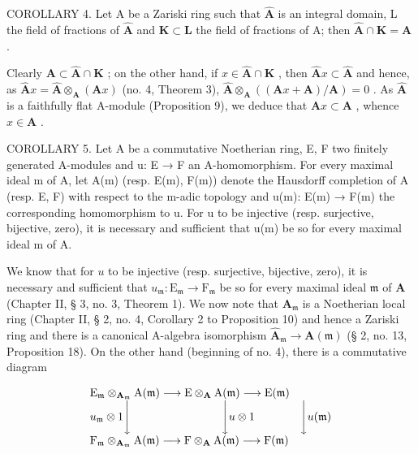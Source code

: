 COROLLARY 4. Let A be a Zariski ring such that \(\hat{\mathbf{A}}\) is an integral domain, L the field of fractions of \(\hat{\mathbf{A}}\) and \(\mathbf{K} \subset \mathbf{L}\) the field of fractions of A; then \(\hat{\mathbf{A}} \cap \mathbf{K} = \mathbf{A}\) .

Clearly \(\mathbf{A} \subset \hat{\mathbf{A}} \cap \mathbf{K}\) ; on the other hand, if \(x \in \hat{\mathbf{A}} \cap \mathbf{K}\) , then \(\hat{\mathbf{A}}x \subset \hat{\mathbf{A}}\) and hence, as \(\hat{\mathbf{A}}x = \hat{\mathbf{A}} \otimes_{\mathbf{A}} (\mathbf{A}x)\) (no. 4, Theorem 3), \(\hat{\mathbf{A}} \otimes_{\mathbf{A}} ((\mathbf{A}x + \mathbf{A}) / \mathbf{A}) = 0\) . As \(\hat{\mathbf{A}}\) is a faithfully flat A-module (Proposition 9), we deduce that \(\mathbf{A}x \subset \mathbf{A}\) , whence \(x \in \mathbf{A}\) .

COROLLARY 5. Let A be a commutative Noetherian ring, E, F two finitely generated A-modules and u: E → F an A-homomorphism. For every maximal ideal m of A, let A(m) (resp. E(m), F(m)) denote the Hausdorff completion of A (resp. E, F) with respect to the m-adic topology and u(m): E(m) → F(m) the corresponding homomorphism to u. For u to be injective (resp. surjective, bijective, zero), it is necessary and sufficient that u(m) be so for every maximal ideal m of A.

We know that for \(u\) to be injective (resp. surjective, bijective, zero), it is necessary and sufficient that \(u_{\mathfrak{m}}: \mathrm{E}_{\mathfrak{m}} \to \mathrm{F}_{\mathfrak{m}}\) be so for every maximal ideal \(\mathfrak{m}\) of \(\mathbf{A}\) (Chapter II, § 3, no. 3, Theorem 1). We now note that \(\mathbf{A}_{\mathfrak{m}}\) is a Noetherian local ring (Chapter II, § 2, no. 4, Corollary 2 to Proposition 10) and hence a Zariski ring and there is a canonical A-algebra isomorphism \(\hat{\mathbf{A}}_{\mathfrak{m}} \to \mathbf{A}(\mathfrak{m})\) (§ 2, no. 13, Proposition 18). On the other hand (beginning of no. 4), there is a commutative diagram

\[
\begin{array}{l} \mathrm{E} _ {\mathfrak {m}} \otimes_ {\mathbf {A} _ {\mathfrak {m}}} \mathrm{A} (\mathfrak {m}) \longrightarrow \mathrm{E} \otimes_ {\mathbf {A}} \mathrm{A} (\mathfrak {m}) \longrightarrow \mathrm{E} (\mathfrak {m}) \\ u _ {\mathfrak {m}} \otimes 1 \Biggl \downarrow \qquad \qquad \qquad \qquad \Biggl \downarrow u \otimes 1 \qquad \qquad \Biggl \downarrow u (\mathfrak {m}) \\ \mathrm{F} _ {\mathfrak {m}} \otimes_ {\mathbf {A} _ {\mathfrak {m}}} \mathrm{A} (\mathfrak {m}) \longrightarrow \mathrm{F} \otimes_ {\mathbf {A}} \mathrm{A} (\mathfrak {m}) \longrightarrow \mathrm{F} (\mathfrak {m}) \end{array}
\]

